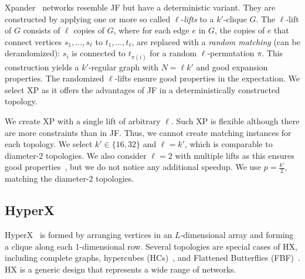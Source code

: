 Xpander~\cite{valadarsky2015} networks resemble JF but have a
deterministic variant.  They are constructed by applying one or more so called
$\ell$-\emph{lifts} to a $k'$-clique  $G$.
%
The $\ell$-lift of $G$ consists of $\ell$ copies of $G$, where for each edge
$e$ in $G$, the copies of $e$ that connect vertices $s_1, \dots, s_\ell$ to
$t_1, \dots, t_\ell$, are replaced with a \emph{random matching} (can be
derandomized): $s_i$ is connected to $t_{\pi(i)}$ for a random
$\ell$-permutation $\pi$.
%
This construction yields a $k'$-regular graph with $N = \ell k'$ and good
expansion properties. The randomized $\ell$-lifts ensure good properties in the
expectation.
%
% 
%
We select XP as it offers the advantages of JF in a deterministically
constructed topology.


\noindent
{}
%
We create XP with a single lift of arbitrary $\ell$. Such XP is
flexible although there are more constraints than in JF.  Thus, we cannot
create matching instances for each topology. We select $k' \in \{16, 32\}$ and
$\ell = k'$, which is comparable to diameter-2 topologies. We also consider
$\ell = 2$ with multiple lifts as this ensures good
properties~\cite{valadarsky2015}, but we do not notice any additional speedup.
We use $p = \frac{k'}2$, matching the diameter-2 topologies. 

\subsection{HyperX}
 
HyperX~\cite{ahn2009hyperx} is formed by arranging vertices in an
$L$-dimensional array and forming a clique along each 1-dimensional row.
Several topologies are special cases of HX, including complete graphs,
hypercubes (HCs)~\cite{bondy1976graph}, and Flattened Butterflies
(FBF)~\cite{kim2007flattened}. HX is a generic design that represents a wide
range of networks. 


